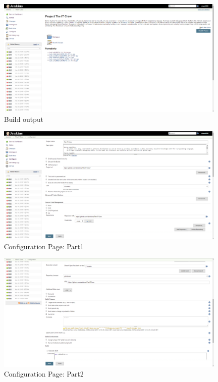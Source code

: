 \documentclass[UTF8]{article}
\begin{document}
\begin{figure}[h]
  \includegraphics[width=\textwidth, height=\textheight,keepaspectratio]{JenkinsSetup0}
  \caption{Build output}
\end{figure}

\begin{figure}[h]
  \includegraphics[width=\textwidth, height=\textheight,keepaspectratio]{JenkinsSetup1}
  \caption{Configuration Page: Part1}
\end{figure}

\newpage
\begin{figure}[h]
  \includegraphics[width=\textwidth, height=\textheight,keepaspectratio]{JenkinsSetup2}
  \caption{Configuration Page: Part2}
\end{figure}
\end{document}
